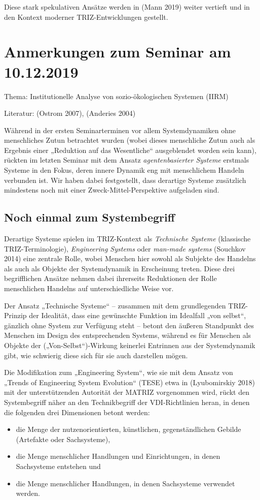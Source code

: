 \documentclass[11pt,a4paper]{article}
\begin{document}
Diese stark spekulativen Ansätze werden in (Mann 2019) weiter vertieft und in
den Kontext moderner TRIZ-Entwicklungen gestellt.

\section{ Anmerkungen zum Seminar am 10.12.2019}

Thema: Institutionelle Analyse von sozio-ökologischen Systemen (IIRM) 

Literatur: (Ostrom 2007), (Anderies 2004) 

Während in der ersten Seminarterminen vor allem Systemdynamiken ohne
menschliches Zutun betrachtet wurden (wobei dieses menschliche Zutun auch als
Ergebnis einer „Reduktion auf das Wesentliche“ ausgeblendet worden sein kann),
rückten im letzten Seminar mit dem Ansatz \emph{agentenbasierter Systeme}
erstmals Systeme in den Fokus, deren innere Dynamik eng mit menschlichem
Handeln verbunden ist. Wir haben dabei festgestellt, dass derartige Systeme
zusätzlich mindestens noch mit einer Zweck-Mittel-Perspektive aufgeladen sind.

\subsection{Noch einmal zum Systembegriff}

Derartige Systeme spielen im TRIZ-Kontext als \emph{Technische Systeme}
(klassische TRIZ-Terminologie), \emph{Engineering Systems} oder \emph{man-made
  systems} (Souchkov 2014) eine zentrale Rolle, wobei Menschen hier sowohl als
Subjekte des Handelns als auch als Objekte der Systemdynamik in Erscheinung
treten. Diese drei begriff\-lichen Ansätze nehmen dabei ihrerseits Reduktionen
der Rolle menschlichen Handelns auf unterschiedliche Weise vor.

Der Ansatz „Technische Systeme“ -- zusammen mit dem grundlegenden TRIZ-Prinzip
der Idealität, dass eine gewünschte Funktion im Idealfall „von selbst“,
gänzlich ohne System zur Verfügung steht -- betont den äußeren Standpunkt des
Menschen im Design des entsprechenden Systems, während es für Menschen als
Objekte der („Von-Selbst“)-Wirkung keinerlei Entrinnen aus der Systemdynamik
gibt, wie schwierig diese sich für sie auch darstellen mögen.

Die Modifikation zum „Engineering System“, wie sie mit dem Ansatz von
„Trends of Engineering System Evolution“ (TESE) etwa in (Lyubomirskiy
2018) mit der unterstützenden Autorität der MATRIZ vorgenommen wird,
rückt den Systembegriff näher an den Technikbegriff der VDI-Richtlinien
heran, in denen die folgenden drei Dimensionen betont werden: 
\begin{itemize}
\item die Menge der nutzenorientierten, künstlichen, gegenständlichen Gebilde
  (Artefakte oder Sachsysteme),
\item die Menge menschlicher Handlungen und Einrichtungen, in denen
  Sachsysteme entstehen und
\item die Menge menschlicher Handlungen, in denen Sachsysteme verwendet
  werden.
\end{itemize}
\end{document}
